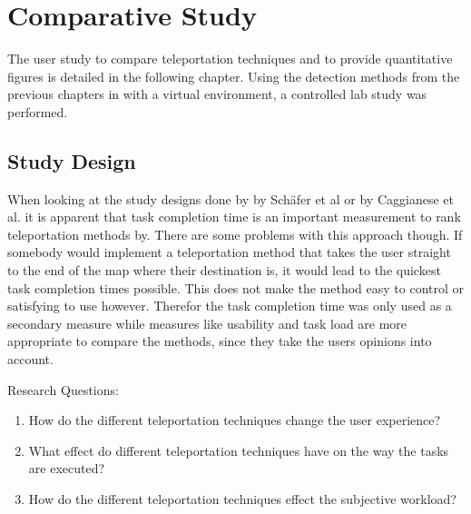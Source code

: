 \chapter{Comparative Study}
The user study to compare teleportation techniques and to provide quantitative figures is detailed in the following chapter. Using the detection methods from the previous chapters in with a virtual environment, a controlled lab study was performed. 




\section{Study Design}
When looking at the study designs done by by Schäfer et al \cite{Schafer2021} or by Caggianese et al. \cite{Caggianese} it is apparent that task completion time is an important measurement to rank teleportation methods by. There are some problems with this approach though. If somebody would implement a teleportation method that takes the user straight to the end of the map where their destination is, it would lead to the quickest task completion times possible. This does not make the method easy to control or satisfying to use however. Therefor the task completion time was only used as a secondary measure while measures like usability and task load are more appropriate to compare the methods, since they take the users opinions into account. 

Research Questions:
\begin{enumerate}
    \item How do the different teleportation techniques change the user experience?
    \item What effect do different teleportation techniques have on the way the tasks are executed?
    \item How do the different teleportation techniques effect the subjective workload?
\end{enumerate}


